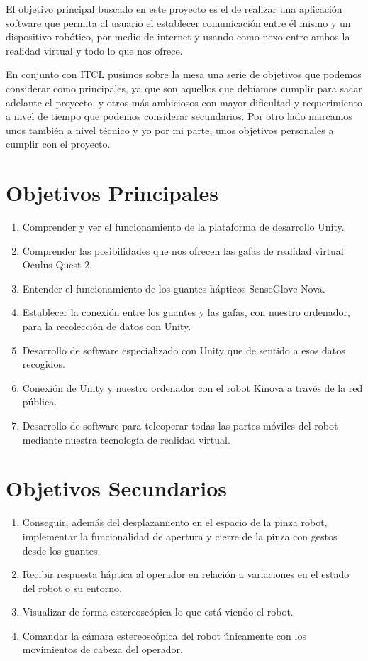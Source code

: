 
El objetivo principal buscado en este proyecto es el de realizar una aplicación software que permita al usuario el establecer comunicación entre él mismo y un dispositivo robótico, por medio de internet y usando como nexo entre ambos la realidad virtual y todo lo que nos ofrece.

En conjunto con ITCL\cite{itcl} pusimos sobre la mesa una serie de objetivos que podemos considerar como principales, ya que son aquellos que debíamos cumplir para sacar adelante el proyecto, y otros más ambiciosos con mayor dificultad y requerimiento a nivel de tiempo que podemos considerar secundarios. Por otro lado marcamos unos también a nivel técnico y yo por mi parte, unos objetivos personales a cumplir con el proyecto.

\section{Objetivos Principales}
\begin{enumerate}
    \item Comprender y ver el funcionamiento de la plataforma de desarrollo Unity\cite{Unity}.
    \item Comprender las posibilidades que nos ofrecen las gafas de realidad virtual Oculus Quest 2\cite{Quest2}.
    \item Entender el funcionamiento de los guantes hápticos SenseGlove Nova.
    \item Establecer la conexión entre los guantes y las gafas, con nuestro ordenador, para la recolección de datos con Unity.
    \item Desarrollo de software especializado con Unity que de sentido a esos datos recogidos.
    \item Conexión de Unity y nuestro ordenador con el robot Kinova a través de la red pública.
    \item Desarrollo de software para teleoperar todas las partes móviles del robot mediante nuestra tecnología de realidad virtual. 
\end{enumerate}

\section{Objetivos Secundarios}
\begin{enumerate}
    \item Conseguir, además del desplazamiento en el espacio de la pinza robot, implementar la funcionalidad de apertura y cierre de la pinza con gestos desde los guantes.
    \item Recibir respuesta háptica\cite{Haptica1} al operador en relación a variaciones en el estado del robot o su entorno.
    \item Visualizar de forma estereoscópica lo que está viendo el robot.
    \item Comandar la cámara estereoscópica del robot únicamente con los movimientos de cabeza del operador.
\end{enumerate}

